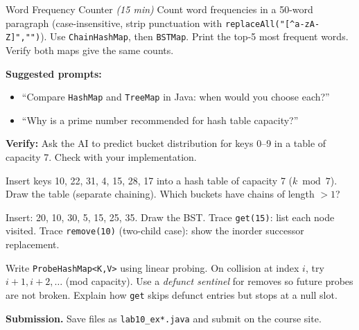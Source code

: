 \documentclass[11pt]{article}
\begin{document}
\begin{labexercise}{Word Frequency Counter \hfill {\small \itshape (15 min)}}
Count word frequencies in a 50-word paragraph (case-insensitive, strip punctuation with
\texttt{replaceAll("[{\textasciicircum}a-zA-Z]","")}).
Use \texttt{ChainHashMap}, then \texttt{BSTMap}. Print the top-5 most frequent words.
Verify both maps give the same counts.
\end{labexercise}

\begin{aicollab}
\textbf{Suggested prompts:}
\begin{itemize}[leftmargin=*,nosep]
  \item ``Compare \texttt{HashMap} and \texttt{TreeMap} in Java: when would you choose each?''
  \item ``Why is a prime number recommended for hash table capacity?''
\end{itemize}
\medskip\textbf{Verify:} Ask the AI to predict bucket distribution for keys 0--9 in a table of
capacity 7. Check with your implementation.
\end{aicollab}

\takehomebanner

\begin{trace}
Insert keys 10, 22, 31, 4, 15, 28, 17 into a hash table of capacity 7 ($k \bmod 7$).
Draw the table (separate chaining). Which buckets have chains of length $> 1$?
\end{trace}

\begin{trace}
Insert: 20, 10, 30, 5, 15, 25, 35. Draw the BST.
Trace \texttt{get(15)}: list each node visited.
Trace \texttt{remove(10)} (two-child case): show the inorder successor replacement.
\end{trace}

\begin{writecode}
Write \texttt{ProbeHashMap<K,V>} using linear probing.
On collision at index $i$, try $i+1, i+2, \ldots$ (mod capacity).
Use a \emph{defunct sentinel} for removes so future probes are not broken.
Explain how \texttt{get} skips defunct entries but stops at a null slot.
\end{writecode}

\vspace{4pt}
\noindent\textbf{Submission.} Save files as \texttt{lab10\_ex*.java} and submit on the course site.
\end{document}
